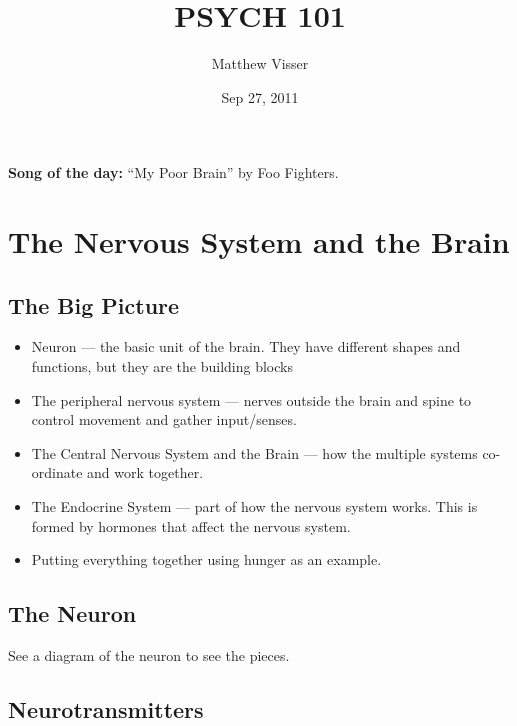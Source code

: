 \documentclass[12pt]{article}
\begin{document}
\title{PSYCH 101}
\author{Matthew Visser}
\date{Sep 27, 2011}
\maketitle

\textbf{Song of the day:} ``My Poor Brain'' by Foo Fighters.

\section{The Nervous System and the Brain}

\subsection{The Big Picture}

\begin{itemize}
    \item Neuron --- the basic unit of the brain. They have different shapes and
        functions, but they are the building blocks
    \item The peripheral nervous system --- nerves outside the brain and spine to
        control movement and gather input/senses.
    \item The Central Nervous System and the Brain --- how the multiple systems
        co-ordinate and work together.
    \item The Endocrine System --- part of how the nervous system works. This is
        formed by hormones that affect the nervous system.
    \item Putting everything together using hunger as an example.
\end{itemize}

\subsection{The Neuron}

See a diagram of the neuron to see the pieces.

\subsection{Neurotransmitters}
\end{document}
